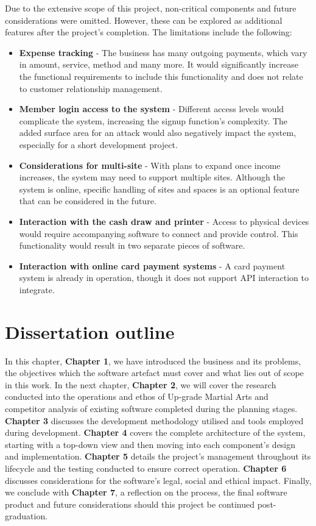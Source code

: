 Due to the extensive scope of this project, non-critical components and future considerations were omitted. However, these can be explored as additional features after the project's completion. The limitations include the following:
\begin{itemize}
    \item \textbf{Expense tracking} - The business has many outgoing payments, which vary in amount, service, method and many more. It would significantly increase the functional requirements to include this functionality and does not relate to customer relationship management.
    \item \textbf{Member login access to the system} - Different access levels would complicate the system, increasing the signup function's complexity. The added surface area for an attack would also negatively impact the system, especially for a short development project.
    \item \textbf{Considerations for multi-site} - With plans to expand once income increases, the system may need to support multiple sites. Although the system is online, specific handling of sites and spaces is an optional feature that can be considered in the future.
    \item \textbf{Interaction with the cash draw and printer} - Access to physical devices would require accompanying software to connect and provide control. This functionality would result in two separate pieces of software. 
    \item \textbf{Interaction with online card payment systems} - A card payment system is already in operation, though it does not support API interaction to integrate.
\end{itemize}



\section{Dissertation outline}

In this chapter, \textbf{Chapter 1}, we have introduced the business and its problems, the objectives which the software artefact must cover and what lies out of scope in this work. In the next chapter, \textbf{Chapter 2}, we will cover the research conducted into the operations and ethos of Up-grade Martial Arts and competitor analysis of existing software completed during the planning stages. \textbf{Chapter 3} discusses the development methodology utilised and tools employed during development. \textbf{Chapter 4} covers the complete architecture of the system, starting with a top-down view and then moving into each component's design and implementation. \textbf{Chapter 5} details the project's management throughout its lifecycle and the testing conducted to ensure correct operation. \textbf{Chapter 6} discusses considerations for the software's legal, social and ethical impact. Finally, we conclude with \textbf{Chapter 7}, a reflection on the process, the final software product and future considerations should this project be continued post-graduation.
